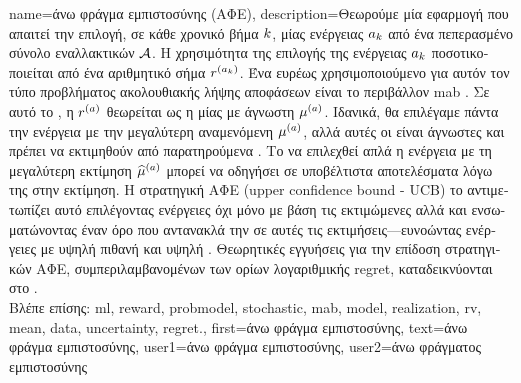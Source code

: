 {name={\foreignlanguage{greek}{άνω φράγμα εμπιστοσύνης (ΑΦΕ)}},
	description={\foreignlanguage{greek}{Θεωρούμε μία εφαρμογή} 
		 \foreignlanguage{greek}{που απαιτεί την επιλογή, σε κάθε χρονικό βήμα $k$, μίας ενέργειας 
		$a_{k}$ από ένα πεπερασμένο σύνολο εναλλακτικών $\mathcal{A}$.} \foreignlanguage{greek}{Η χρησιμότητα της 
		επιλογής της ενέργειας $a_{k}$ ποσοτικοποιείται από ένα αριθμητικό σήμα}  
		$r^{(a_{k})}$. \foreignlanguage{greek}{Ένα ευρέως χρησιμοποιούμενο}  
		\foreignlanguage{greek}{για αυτόν τον τύπο προβλήματος ακολουθιακής λήψης αποφάσεων είναι το περιβάλλον} 
		 \gls{mab} \cite{Bubeck2012}. \foreignlanguage{greek}{Σε αυτό το} , 
		\foreignlanguage{greek}{η}  $r^{(a)}$ \foreignlanguage{greek}{θεωρείται ως η} 
		 \foreignlanguage{greek}{μίας}  \foreignlanguage{greek}{με άγνωστη} 
		 $\mu^{(a)}$. \foreignlanguage{greek}{Ιδανικά, θα επιλέγαμε πάντα την ενέργεια με την 
		μεγαλύτερη αναμενόμενη}  $\mu^{(a)}$, \foreignlanguage{greek}{αλλά αυτές οι}  
		 \foreignlanguage{greek}{είναι άγνωστες και πρέπει να εκτιμηθούν από παρατηρούμενα} . 
		\foreignlanguage{greek}{Το να επιλε\-χθεί απλά η ενέργεια με τη μεγαλύτερη εκτίμηση $\widehat{\mu}^{(a)}$ 
		μπορεί να οδηγήσει σε υποβέλτιστα αποτελέσματα λόγω της}  \foreignlanguage{greek}{στην 
		εκτίμηση. Η στρατηγική ΑΦΕ} (upper confidence bound - UCB) \foreignlanguage{greek}{το αντιμετωπίζει αυτό 
		επιλέγοντας ενέργειες όχι μόνο με βάση τις εκτιμώμενες}  \foreignlanguage{greek}{αλλά και
		ενσωματώνοντας έναν όρο που αντανακλά την}  \foreignlanguage{greek}{σε αυτές τις 
		εκτιμήσεις—ευνοώντας ενέργειες με υψηλή πιθανή}  \foreignlanguage{greek}{και υψηλή} 
		. \foreignlanguage{greek}{Θεωρητικές εγγυήσεις για την επίδοση στρατηγικών ΑΦΕ, 
		συμπεριλαμβανομένων των ορίων λογαριθμικής} \gls{regret}, \foreignlanguage{greek}{καταδεικνύονται στο} \cite{Bubeck2012}.\\
		\foreignlanguage{greek}{Βλέπε επίσης:} \gls{ml}, \gls{reward}, \gls{probmodel}, \gls{stochastic}, \gls{mab}, \gls{model}, 
		\gls{realization}, \gls{rv}, \gls{mean}, \gls{data}, \gls{uncertainty}, \gls{regret}.},
	first={\foreignlanguage{greek}{άνω φράγμα εμπιστοσύνης}},
	text={\foreignlanguage{greek}{άνω φράγμα εμπιστοσύνης}},
	user1={\foreignlanguage{greek}{άνω φράγμα εμπιστοσύνης}}, %
    	user2={\foreignlanguage{greek}{άνω φράγματος εμπιστοσύνης}} %
}

